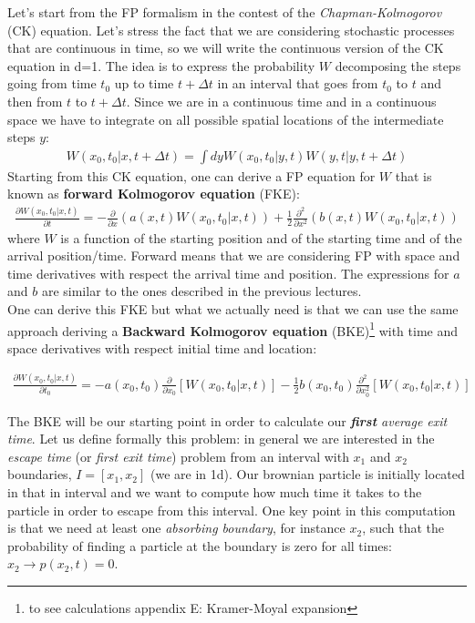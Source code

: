 \documentclass[\main/main.tex]{subfiles}
\begin{document}
Let's start from the FP formalism in the contest of the \textit{Chapman-Kolmogorov} (CK) equation. Let's stress the fact that we are considering stochastic processes that are continuous in time, so we will write the continuous version of the CK equation in d=1.
The idea is to express the probability $W$ decomposing the steps going from time $t_0$ up to time $t+\Delta t$ in an interval that goes from $t_0$ to $t$ and then from $t$ to $t+\Delta t$. Since we are in a continuous time and in a continuous space we have to integrate on all possible spatial locations of the intermediate steps $y$:
\begin{eqnarray} 
W(x_0,t_0|x,t+\Delta t)= \int dy W(x_0,t_0|y,t) W(y,t|y,t+\Delta t)
\end{eqnarray}
Starting from this CK equation, one can derive a FP equation for $W$ that is known as \textbf{forward Kolmogorov equation} (FKE):
\begin{eqnarray}
\frac{\partial W(x_0,t_0|x,t)}{\partial t}=-\frac{\partial}{\partial x}(a(x,t) W(x_0,t_0|x,t))+ \frac{1}{2}\frac{\partial^2}{\partial x^2}(b(x,t)W(x_0,t_0|x,t))
\end{eqnarray}
where $W$ is a function of the starting position and of the starting time and of the arrival position/time. Forward means that we are considering FP with space and time derivatives with respect the arrival time and position. The expressions for $a$ and $b$ are similar to the ones described in the previous lectures. \\

One can derive this FKE but what we actually need is that we can use the same approach deriving a \textbf{Backward Kolmogorov equation} (BKE)\footnote{to see calculations appendix E: Kramer-Moyal expansion} with time and space derivatives with respect initial time and location:

\begin{eqnarray}
\frac{\partial W(x_0,t_0|x,t)}{\partial t_0}=-a(x_0,t_0)\frac{\partial}{\partial x_0}[ W(x_0,t_0|x,t)]-\frac{1}{2}b(x_0,t_0)\frac{\partial^2}{\partial x_0^2}[W(x_0,t_0|x,t)]
\end{eqnarray}

The BKE will be our starting point in order to calculate our\textit{ \textbf{first} average exit time}.
Let us define formally this problem: in general we are interested in the \textit{escape time} (or \textit{first exit time}) problem from an interval with $x_1$ and $x_2$ boundaries, $I=[x_1,x_2]$ (we are in 1d).
Our brownian particle is initially located in that in
interval and we want to compute how much time it takes to the particle in order to escape from this interval.
One key point in this computation is that we need at least one \textit{absorbing boundary}, for instance $x_2$, such that the probability of finding a particle at the boundary is zero for all times: $x_2\to p(x_2,t)=0$. 
\end{document}
